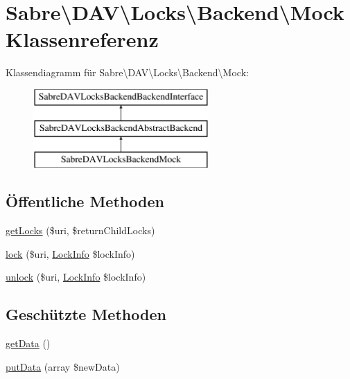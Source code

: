 \hypertarget{class_sabre_1_1_d_a_v_1_1_locks_1_1_backend_1_1_mock}{}\section{Sabre\textbackslash{}D\+AV\textbackslash{}Locks\textbackslash{}Backend\textbackslash{}Mock Klassenreferenz}
\label{class_sabre_1_1_d_a_v_1_1_locks_1_1_backend_1_1_mock}
Klassendiagramm für Sabre\textbackslash{}D\+AV\textbackslash{}Locks\textbackslash{}Backend\textbackslash{}Mock\+:\begin{figure}[H]
\begin{center}
\leavevmode
\includegraphics[height=3.000000cm]{class_sabre_1_1_d_a_v_1_1_locks_1_1_backend_1_1_mock}
\end{center}
\end{figure}
\subsection*{Öffentliche Methoden}
\begin{DoxyCompactItemize}
\item 
\mbox{\hyperlink{class_sabre_1_1_d_a_v_1_1_locks_1_1_backend_1_1_mock_a34110fb10d7dac595e785beb4cef328b}{get\+Locks}} (\$uri, \$return\+Child\+Locks)
\item 
\mbox{\hyperlink{class_sabre_1_1_d_a_v_1_1_locks_1_1_backend_1_1_mock_a2d04dfc74be5a35e34671b008372ed15}{lock}} (\$uri, \mbox{\hyperlink{class_sabre_1_1_d_a_v_1_1_locks_1_1_lock_info}{Lock\+Info}} \$lock\+Info)
\item 
\mbox{\hyperlink{class_sabre_1_1_d_a_v_1_1_locks_1_1_backend_1_1_mock_a0e83378cbf7fd7ee247a913870c41e2e}{unlock}} (\$uri, \mbox{\hyperlink{class_sabre_1_1_d_a_v_1_1_locks_1_1_lock_info}{Lock\+Info}} \$lock\+Info)
\end{DoxyCompactItemize}
\subsection*{Geschützte Methoden}
\begin{DoxyCompactItemize}
\item 
\mbox{\hyperlink{class_sabre_1_1_d_a_v_1_1_locks_1_1_backend_1_1_mock_ae64e58888c3b627080afbf3fc21f2e28}{get\+Data}} ()
\item 
\mbox{\hyperlink{class_sabre_1_1_d_a_v_1_1_locks_1_1_backend_1_1_mock_a250dda69b59d41cb56c084bf6e758618}{put\+Data}} (array \$new\+Data)
\end{DoxyCompactItemize}
